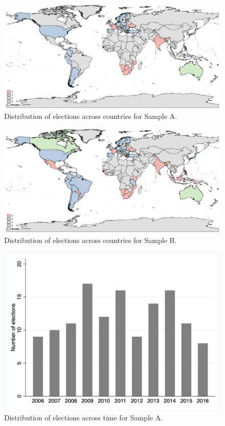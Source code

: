 \documentclass[12pt,a4paper]{article}
\begin{document}
\begin{landscape}
\begin{figure}[th]
	\centering
	\includegraphics[scale=0.45]{../output/plots/map1.png}
	\caption{Distribution of elections across countries for Sample A.}
	\label{map1}
\end{figure}

\begin{figure}[th]
	\centering
	\includegraphics[scale=0.45]{../output/plots/map2.png}
	\caption{Distribution of elections across countries for Sample B.}
	\label{map2}
\end{figure}
\end{landscape}

\clearpage
\begin{figure}[th]
	\centering
	\includegraphics[scale=0.4]{../output/plots/elec_freq.png}
	\caption{Distribution of elections across time for Sample A.}
	\label{bar1}
\end{figure}
\end{document}
